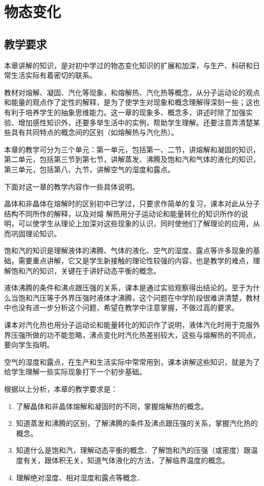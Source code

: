 \chapter{物态变化}\minitoc[n]
\section{教学要求}
本章讲解的知识，是对初中学过的物态变化知识的扩展和加深，与生产、科研和日常生活实际有着密切的联系。

教材对熔解、凝固、汽化等现象，和熔解热、汽化热等概念，从分子运动论的观点和能量的观点作了定性的解释，是为了使学生对现象和概念理解得深刻一些；这也有利于培养学生的抽象思维能力。这一章的现象多、概念多，讲述时除了加强实验、增加感性知识外，还要多举生活中的实例，帮助学生理解。还要注意弄清楚某些具有共同特点的概念间的区别（如熔解热与汽化热）。

本章的教学可分为三个单元：第一单元，包括第一、二节，讲熔解和凝固的知识，第二单元，包括第三节到第七节，讲解蒸发、沸腾及饱和汽和气体的液化的知识，第三单元，包括第八、九节，讲解空气的湿度和露点。

下面对这一章的教学内容作一些具体说明。

晶体和非晶体在熔解时的区别初中已学过，只要求作简单的复习，课本对此从分子结构不同所作的解释，以及对熔
解热用分子运动论和能量转化的知识所作的说明，可以使学生从理论上加深对这些现象的认识，同时使他们了解理论的应用，从而巩固理论知识。

饱和汽的知识是理解液体的沸腾、气体的液化、空气的湿度、露点等许多现象的基础，需要重点讲解，它又是学生新接触的理论性较强的内容，也是教学的难点，理解饱和汽的知识，关键在于讲好动态平衡的概念。

液体沸腾的条件和沸点跟压强的关系，课本是通过实验观察得出结论的。至于为什么当饱和汽压等于外界压强时液体才沸腾，这个问题在中学阶段很难讲清楚，教材中也没有进一步分析这个问题，希望在教学中注意掌握，不做过高的要求。

课本对汽化热也用分子运动论和能量转化的知识作了说明，液体汽化时用于克服外界压强所做的功不能忽略，沸点变化时汽化热差别较大，这些与熔解热的不同点，要向学生指明。

空气的湿度和露点，在生产和生活实际中常常用到，课本讲解这些知识，就是为了给学生理解一些实际现象打下一个初步基础。

根据以上分析，本章的教学要求是：
\begin{enumerate}
\item 了解晶体和非晶体熔解和凝固时的不同，掌握熔解热的概念。
\item 知道蒸发和沸腾的区别，了解沸腾的条件及沸点跟压强的关系，掌握汽化热的概念。
\item 知道什么是饱和汽，理解动态平衡的概念．了解饱和汽的压强（或密度）跟温度有关，跟体积无关，知道气体液化的方法，了解临界温度的概念。
\item 理解绝对湿度、相对湿度和露点等概念．
\end{enumerate}

